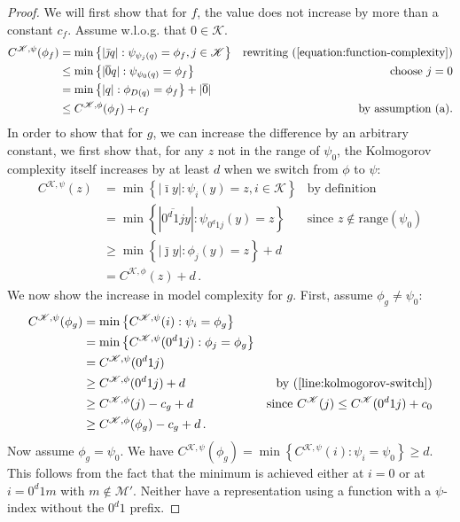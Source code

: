 \documentclass{style/llncs}
\newcommand{\M}{\mathscr M}
\newcommand{\K}{\mathscr K}
\newcommand{\bi}{\bar\imath}
\newcommand{\p}{\,\text{.}}
\begin{document}
\begin{proof}
We will first show that for $f$, the value does not increase by more than a constant $c_f$. Assume w.l.o.g. that $0 \in \K$.
\begin{align*}
C^{\K, \psi}(\phi_f) &= \min\left\{|\bar \jmath q| : \psi_{\psi_j(q)} = \phi_f, j \in \K \right\} & \text{rewriting (\ref{equation:function-complexity})} \\
&\leq \min \left\{ |\overline{0} q| : \psi_{\psi_0(q)} = \phi_f \right\}& \text{choose $j=0$} \\
&= \min \left\{ |q| : \phi_{D(q)} = \phi_f \right\} + |\overline{0}| \\
&\leq C^{\K, \phi}(\phi_f) + c_f & \text{by assumption (a).}
\end{align*}
In order to show that for $g$, we can increase the difference by an arbitrary constant, we first show that, for any $z$ not in the range of $\psi_0$, the Kolmogorov complexity itself increases by at least $d$ when we switch from $\phi$ to $\psi$:
\begin{align}
C^{\K, \psi}(z) &= \min\left\{|\bi y| : \psi_i(y) = z, i \in \K \right\} & \text{by definition}\nonumber\\
&= \min\left\{|\overline{0^d1j} y| : \psi_{0^d1j}(y) = z \right\} & \text{since $z\notin \text{range}(\psi_0)$} \nonumber\\
&\geq \min\left\{|\bar \jmath y| : \phi_{j}(y) = z \right\} + d &\nonumber\\
&= C^{\K, \phi}(z) + d\p & \label{line:kolmogorov-switch}
\end{align}
We now show the increase in model complexity for $g$. First, assume $\phi_g \neq \psi_0$:
\begin{align*}
C^{\K,\psi}(\phi_g) &= \min \left\{C^{\K, \psi}(i) : \psi_i = \phi_g \right\} \\
&= \min \left\{C^{\K, \psi}(0^d1j) : \phi_j = \phi_g \right\} \\
&= C^{\K, \psi}(0^d1j) \\
&\geq C^{\K,\phi}(0^d1j) + d & \text{by (\ref{line:kolmogorov-switch})} \\
&\geq C^{\K,\phi}(j) - c_g + d &\text{since $C^\K(j) \leq C^\K(0^d1j) + c_0$}\\
&\geq C^{\K, \phi}(\phi_g) - c_g + d \p
\end{align*}
Now assume $\phi_g = \psi_0$. We have $C^{\K,\psi}(\phi_g) = \min\left\{C^{\K, \psi}(i) : \psi_i = \psi_0 \right\} \geq d$. This follows from the fact that the minimum is achieved either at $i = 0$ or at $i = 0^d1m$ with $m \notin \M'$. Neither have a representation using a function with a $\psi$-index without the $0^d1$ prefix.


\end{proof}
\end{document}
